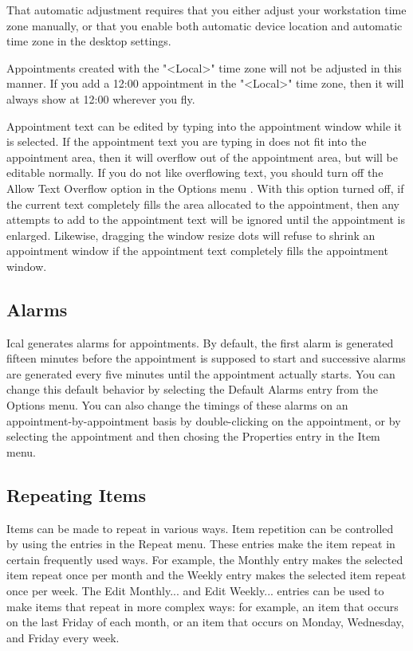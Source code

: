 \documentclass[a4paper,english]{article}
\begin{document}
        That automatic adjustment requires that you either adjust your
        workstation time zone manually, or that you enable both
        automatic device location and automatic time zone in the
        desktop settings.

        Appointments created with the "<Local>" time zone will not be
        adjusted in this manner. If you add a 12:00 appointment in the
        "<Local>" time zone, then it will always show at 12:00
        wherever you fly.

        Appointment text can be edited by typing into the appointment
        window while it is selected.  If the appointment text you are
        typing in does not fit into the appointment area, then it will
        overflow out of the appointment area, but will be editable
        normally.  If you do not like overflowing text, you should
        turn off the Allow Text Overflow option in the Options menu .
        With this option turned off, if the current text completely
        fills the area allocated to the appointment, then any attempts
        to add to the appointment text will be ignored until the
        appointment is enlarged.  Likewise, dragging the window resize
        dots will refuse to shrink an appointment window if the
        appointment text completely fills the appointment window.

    \subsection{Alarms}
        Ical generates alarms for appointments. By default, the first
        alarm is generated fifteen minutes before the appointment is
        supposed to start and successive alarms are generated every
        five minutes until the appointment actually starts.  You can
        change this default behavior by selecting the Default Alarms
        entry from the Options menu.  You can also change the timings
        of these alarms on an appointment-by-appointment basis by
        double-clicking on the appointment, or by selecting the
        appointment and then chosing the Properties entry in the Item
        menu.

    \subsection{Repeating Items}
        Items can be made to repeat in various ways. Item repetition
        can be controlled by using the entries in the Repeat menu.
        These entries make the item repeat in certain frequently used
        ways.  For example, the Monthly entry makes the selected item
        repeat once per month and the Weekly entry makes the selected
        item repeat once per week.  The Edit Monthly... and Edit
        Weekly... entries can be used to make items that repeat in
        more complex ways: for example, an item that occurs on the
        last Friday of each month, or an item that occurs on Monday,
        Wednesday, and Friday every week.
\end{document}

